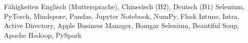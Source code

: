 
\begin{rubric}{Fähigkeiten}
\entry*[Sprachen]
Englisch (Muttersprache), Chinesisch (B$2$), Deutsch (B$1$)
\entry*[Python]
Selenium, PyTorch, Mindspore, Pandas, Jupyter Notebook, NumPy, Flask
\entry*[Systemadministration]
Intune, Intra, Active Directory, Apple Business Manager, Bomgar
\entry*[Data]
Selenium, Beautiful Soup, Apache Hadoop, PySpark
\end{rubric}
